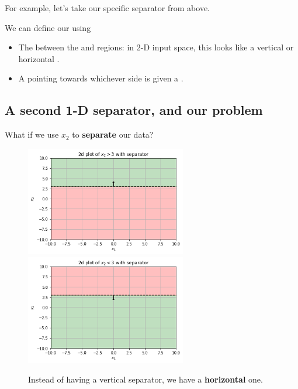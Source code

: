         
        For example, let's take our specific separator from above.\\
        
        \begin{concept}
            We can define our  using
            
            \begin{itemize}
                \item The  between the  and  regions: in 2-D input space, this looks like a vertical or horizontal .
                
                \item A  pointing towards whichever side is given a .
            \end{itemize}
        \end{concept}
    
    \subsection{A second 1-D separator, and our problem}
        
        What if we use $x_2$ to \textbf{separate} our data?
        
        \begin{figure}[H]
                \includegraphics[width=70mm,scale=0.5]{images/classification_images/x2_2d_plot_separator.png}
                \includegraphics[width=70mm,scale=0.5]{images/classification_images/x2_2d_plot_separator_reversed.png}
                
                \caption*{Instead of having a vertical separator, we have a \textbf{horizontal} one.}
        \end{figure}
        
